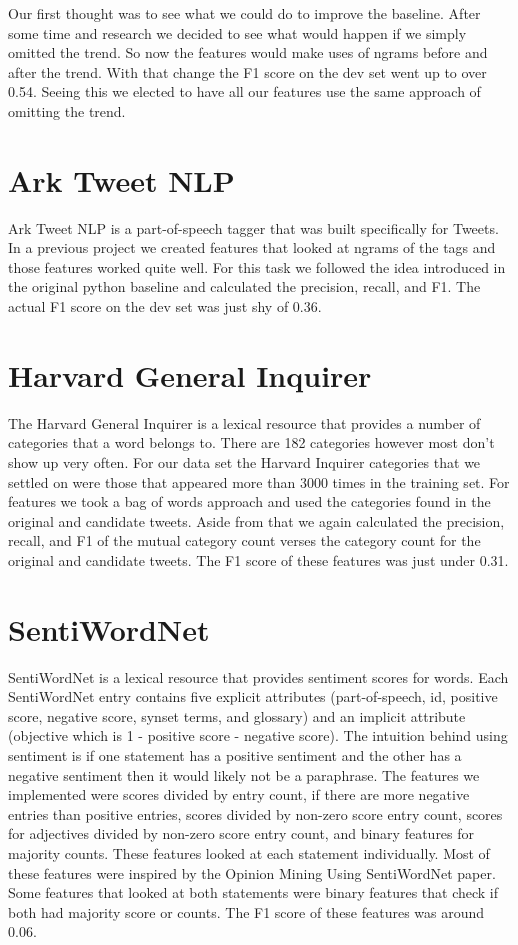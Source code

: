 \documentclass[11pt,letterpaper]{article}
\begin{document}

Our first thought was to see what we could do to improve the baseline. After some time and research we decided to see what would happen if we simply omitted the trend. So now the features would make uses of ngrams before and after the trend. With that change the F1 score on the dev set went up to over 0.54. Seeing this we elected to have all our features use the same approach of omitting the trend.

\section{Ark Tweet NLP}
Ark Tweet NLP is a part-of-speech tagger that was built specifically for Tweets. In a previous project we created features that looked at ngrams of the tags and those features worked quite well. For this task we followed the idea introduced in the original python baseline and calculated the precision, recall, and F1. The actual F1 score on the dev set was just shy of 0.36. %

\section{Harvard General Inquirer}
The Harvard General Inquirer is a lexical resource that provides a number of categories that a word belongs to. There are 182 categories however most don't show up very often. For our data set the Harvard Inquirer categories that we settled on were those that appeared more than 3000 times in the training set. For features we took a bag of words approach and used the categories found in the original and candidate tweets. Aside from that we again calculated the precision, recall, and F1 of the mutual category count verses the category count for the original and candidate tweets. The F1 score of these features was just under 0.31.

\section{SentiWordNet}
SentiWordNet is a lexical resource that provides sentiment scores for words. Each SentiWordNet entry contains five explicit attributes (part-of-speech, id, positive score, negative score, synset terms, and glossary) and an implicit attribute (objective which is 1 - positive score - negative score). 
The intuition behind using sentiment is if one statement has a positive sentiment and the other has a negative sentiment then it would likely not be a paraphrase. The features we implemented were scores divided by entry count, if there are more negative entries than positive entries, scores divided by non-zero score entry count, scores for adjectives divided by non-zero score entry count, and binary features for majority counts. These features looked at each statement individually. Most of these features were inspired by the Opinion Mining Using SentiWordNet paper. Some features that looked at both statements were binary features that check if both had majority score or counts. The F1 score of these features was around 0.06.
\end{document}
